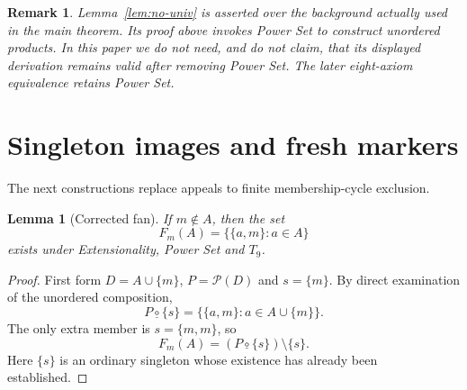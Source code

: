 \documentclass[11pt,a4paper]{article}
\numberwithin{equation}{section}
\newtheorem{lemma}[theorem]{Lemma}
\newtheorem{remark}[theorem]{Remark}
\newcommand{\up}[2]{\{#1,#2\}}
\newcommand{\Comp}{\mathbin{\underline{\circ}}}
\newcommand{\Pow}{\mathcal P}
\newcommand{\Tnine}{T_9}
\begin{document}
\begin{remark}\label{rem:power}
Lemma~\ref{lem:no-univ} is asserted \emph{over the background actually used in the main theorem}.  Its proof above invokes Power Set to construct unordered products.  In this paper we do not need, and do not claim, that its displayed derivation remains valid after removing Power Set.  The later eight-axiom equivalence retains Power Set.
\end{remark}

\section{Singleton images and fresh markers}\label{sec:markers}
The next constructions replace appeals to finite membership-cycle exclusion.

\begin{lemma}[Corrected fan]\label{lem:fan}
If $m\notin A$, then the set
\[
F_m(A)=\{\up am:a\in A\}
\]
exists under Extensionality, Power Set and $\Tnine$.
\end{lemma}
\begin{proof}
First form $D=A\cup\{m\}$, $P=\Pow(D)$ and $s=\{m\}$.  By direct examination of the unordered composition,
\[
P\Comp\{s\}=\{\up am:a\in A\cup\{m\}\}.
\]
The only extra member is $s=\up mm$, so
\begin{equation}\label{eq:fan}
F_m(A)=(P\Comp\{s\})\setminus\{s\}.
\end{equation}
Here $\{s\}$ is an ordinary singleton whose existence has already been established.
\end{proof}
\end{document}
